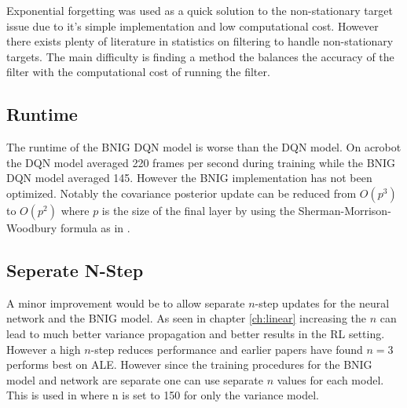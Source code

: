 Exponential forgetting was used as a quick solution to the non-stationary target issue due to it's simple implementation and low computational cost. However there exists plenty of literature in statistics on filtering to handle non-stationary targets. The main difficulty is finding a method the balances the accuracy of the filter with the computational cost of running the filter.

\subsection{Runtime}

The runtime of the BNIG DQN model is worse than the DQN model. On acrobot the DQN model averaged 220 frames per second during training while the BNIG DQN model averaged 145. However the BNIG implementation has not been optimized. Notably the covariance posterior update can be reduced from $O(p^3)$ to $O(p^2)$ where $p$ is the size of the final layer by using the Sherman-Morrison-Woodbury formula as in \cite{donoghue_2017}.

\subsection{Seperate N-Step}

A minor improvement would be to allow separate $n$-step updates for the neural network and the BNIG model. As seen in chapter \ref{ch:linear} increasing the $n$ can lead to much better variance propagation and better results in the RL setting. However a high $n$-step reduces performance and earlier papers have found $n=3$ performs best on ALE\citep{hessel_2017}. However since the training procedures for the BNIG model and network are separate one can use separate $n$ values for each model. This is used in \cite{donoghue_2017} where n is set to 150 for only the variance model.

\cleardoublepage